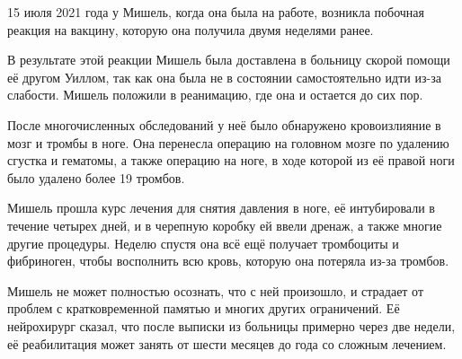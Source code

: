 15 июля 2021 года у Мишель, когда она была на работе, возникла побочная реакция
на вакцину, которую она получила двумя неделями ранее.

В результате этой реакции Мишель была доставлена в больницу скорой помощи её
другом Уиллом, так как она была не в состоянии самостоятельно идти из-за
слабости. Мишель положили в реанимацию, где она и остается до сих пор.

После многочисленных обследований у неё было обнаружено кровоизлияние в мозг и
тромбы в ноге. Она перенесла операцию на головном мозге по удалению сгустка и
гематомы, а также операцию на ноге, в ходе которой из её правой ноги было
удалено более 19 тромбов.

Мишель прошла курс лечения для снятия давления в ноге, её интубировали в течение
четырех дней, и в черепную коробку ей ввели дренаж, а также многие другие
процедуры. Неделю спустя она всё ещё получает тромбоциты и фибриноген, чтобы
восполнить всю кровь, которую она потеряла из-за тромбов.

Мишель не может полностью осознать, что с ней произошло, и страдает от проблем с
кратковременной памятью и многих других ограничений. Её нейрохирург сказал, что
после выписки из больницы примерно через две недели, её реабилитация может
занять от шести месяцев до года со сложным лечением.
